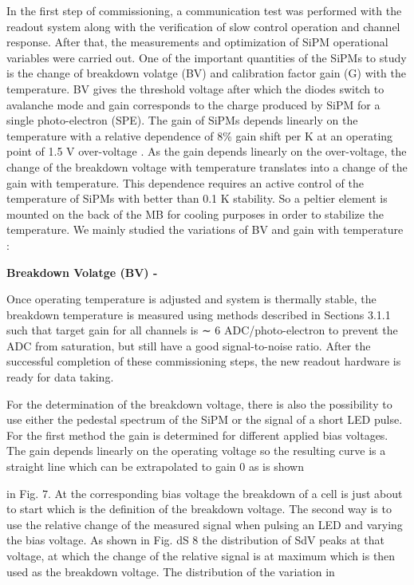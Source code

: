 In the first step of commissioning, a communication test was performed with the readout system along with the verification of slow control operation and channel response. After that, the measurements and optimization of SiPM operational variables were carried out. One of the important quantities of the SiPMs to study is the change of breakdown volatge (BV) and calibration factor gain (G) with the temperature. BV
gives the threshold voltage after which the diodes switch to avalanche mode and gain corresponds to the charge produced by SiPM for a single photo-electron (SPE). The gain of SiPMs depends linearly on the temperature with a relative dependence of 8\% gain shift per K at an operating point of 1.5 V over-voltage \cite{Anderson:2011zzc}. As the gain depends linearly on the over-voltage, the change of the breakdown voltage with temperature translates into a change of the gain with temperature. This dependence requires an active control of the temperature of SiPMs with better than 0.1 K stability. So a peltier element is mounted on the back of the MB for cooling purposes in order to stabilize the temperature. We mainly studied the variations of BV and gain with temperature : \\ \newline

{\bf Breakdown Volatge (BV) -}

Once operating temperature is adjusted and system is thermally stable, the breakdown temperature is measured using methods described
in Sections 3.1.1 such that target gain for all channels is ∼ 6 ADC/photo-electron to
prevent the ADC from saturation, but still have a good signal-to-noise ratio.
After the successful completion of these commissioning steps, the new readout hardware is
ready for data taking.




For the determination of the breakdown voltage, there is also the possibility to use either the
pedestal spectrum of the SiPM or the signal of a short LED pulse. For the first method the gain
is determined for different applied bias voltages. The gain depends linearly on the operating
voltage so the resulting curve is a straight line which can be extrapolated to gain 0 as is shown

in Fig. 7. At the corresponding bias voltage the breakdown of a cell is just about to start
which is the definition of the breakdown voltage. The second way is to use the relative change
of the measured signal when pulsing an LED and varying the bias voltage. As shown in Fig.
dS
8 the distribution of SdV
peaks at that voltage, at which the change of the relative signal is at
maximum which is then used as the breakdown voltage. The distribution of the variation in

